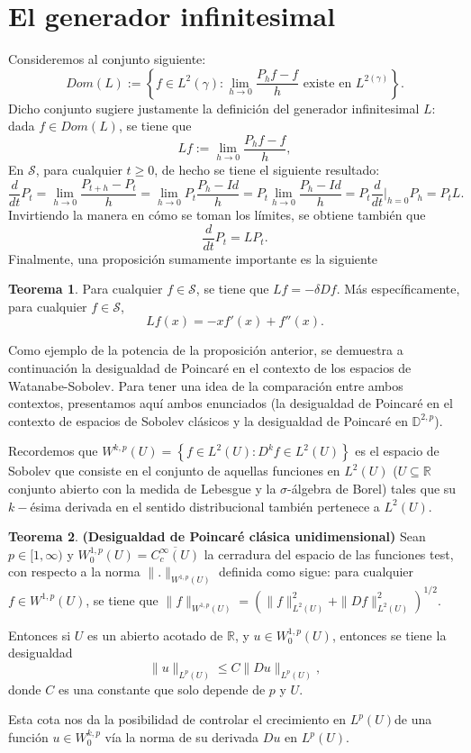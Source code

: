 \documentclass[letterpaper,twoside,12pt]{book}
\newcommand{\R}{\mathbb{R}}
\newcommand{\D}{\mathbb{D}}
\renewcommand{\S}{\mathcal{S}}
\newcommand{\1}{\mathds{1}}
\renewcommand{\to}{\rightarrow}
\theoremstyle{definition}
\theoremstyle{definition}
\newtheorem{teo}{Teorema}
\theoremstyle{definition}
\theoremstyle{definition}
\theoremstyle{definition}
\theoremstyle{definition}
\theoremstyle{definition}
\begin{document}
\section{El generador infinitesimal}
  Consideremos al conjunto siguiente:
  \[
  Dom(L):=\left\{f\in L^2(\gamma): \lim_{h\to 0} \frac{P_{h}f-f}{h} \text{ existe en } L^{2(\gamma)}\right\}.
  \]  
Dicho conjunto sugiere justamente la definición del generador infinitesimal $L$: dada $f\in Dom(L)$, se tiene que 
\[
Lf:=\lim_{h\to 0}\frac{P_hf-f}{h},    
\]
En $\S$, para cualquier $t\geq0$, de hecho se tiene el siguiente resultado:
\[
\frac{d}{dt}P_t=\lim_{h\to0}\frac{P_{t+h}-P_t}{h}=\lim_{h\to0}P_t\frac{P_h-Id}{h}=P_t\lim_{h\to0}\frac{P_h-Id}{h}=P_t\frac{d}{dt}\Bigg|_{h=0}P_h=P_tL.
\]
Invirtiendo la manera en cómo se toman los límites, se obtiene también que
\[
\frac{d}{dt}P_t=LP_t.    
\]
Finalmente, una proposición sumamente importante es la siguiente
\begin{teo} 
 Para cualquier $f\in \S$, se tiene que $Lf=-\delta Df$. Más específicamente, para cualquier $f\in \S$, 
 \[
 Lf(x)=-xf'(x)+f''(x).   
 \]
 \end{teo}
 Como ejemplo de la potencia de la proposición anterior, se demuestra a continuación la desigualdad de Poincaré en el contexto de los espacios de Watanabe-Sobolev.
Para tener una idea de la comparación entre ambos contextos, presentamos aquí ambos enunciados (la desigualdad de Poincaré en el contexto de espacios de Sobolev clásicos y la desigualdad de Poincaré en $\D^{2,p}$).
 
 Recordemos que $W^{k,p}(U)=\left\{f\in L^{2}(U): D^kf\in L^2(U)\right\}$ es el espacio de Sobolev que consiste en el conjunto de aquellas funciones en $L^2(U)$ ($U\subseteq \R$ conjunto abierto con la medida de Lebesgue y la $\sigma$-álgebra de Borel) tales que su $k-$ésima derivada en el sentido distribucional también pertenece a $L^2(U)$.

 \begin{teo}\textbf{(Desigualdad de Poincaré clásica unidimensional)}
    Sean $p\in [1,\infty)$ y $W_0^{1,p}(U)=\overline{C^{\infty}_c(U)}$ la cerradura del espacio de las funciones test, con respecto a la norma $\|.\|_{W^{1,p}(U)}$ definida como sigue: para cualquier $f\in W^{1,p}(U)$, se tiene que $\|f\|_{W^{1,p}(U)}=\left(\|f\|_{L^{2}(U)}^2+\|Df\|_{L^2(U)}^2\right)^{1/2}$.

    Entonces si $U$ es un abierto acotado de $\R$, y $u\in W_0^{1,p}(U)$, entonces se tiene la desigualdad 
    \[
    \|u\|_{L^{p}(U)}\leq C\|Du\|_{L^p(U)},   
    \]
    donde $C$ es una constante que solo depende de $p$ y $U$. 
    \end{teo}
    Esta cota nos da la posibilidad de controlar el crecimiento en $L^p(U)$de una función $u\in W_0^{k,p}$ vía la norma de su derivada $Du$ en $L^p(U)$.
\end{document}
